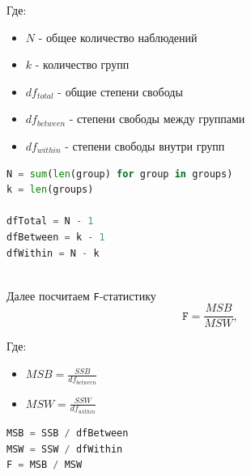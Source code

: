\documentclass[14pt]{extreport}
\begin{document}
	Где:
	\begin{itemize}
		\item $N$ - общее количество наблюдений
		\item $k$ - количество групп
		\item $df_{total}$ - общие степени свободы
		\item $df_{between}$ - степени свободы между группами
		\item $df_{within}$ - степени свободы внутри групп
	\end{itemize}
	
\begin{lstlisting}[language=python, caption=Степени свободы]
N = sum(len(group) for group in groups)  
k = len(groups)                           

dfTotal = N - 1
dfBetween = k - 1
dfWithin = N - k
\end{lstlisting}

\noindent
{}
\\


Далее посчитаем \texttt{F}-статистику
\[
\texttt{F} = \frac{MSB}{MSW},
\]

Где: 
\begin{itemize}
	\item $MSB = \frac{SSB}{df_{between}}$ 
	\item $MSW = \frac{SSW}{df_{within}}$ 
\end{itemize}


	\begin{lstlisting}[language=python, caption=\texttt{F}-статистика]
MSB = SSB / dfBetween 
MSW = SSW / dfWithin
F = MSB / MSW 
\end{lstlisting}

\noindent
{}
\\
\end{document}
